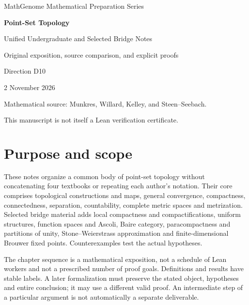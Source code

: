 \documentclass[11pt,oneside,openany]{book}
\theoremstyle{definition}
\theoremstyle{remark}
\begin{document}
\frontmatter

\hypersetup{pageanchor=false}
\begin{titlepage}
\centering
\vspace*{22mm}
{\Large MathGenome Mathematical Preparation Series\par}
\vspace{18mm}
{\Huge\bfseries Point-Set Topology\par}
\vspace{8mm}
{\LARGE Unified Undergraduate and Selected Bridge Notes\par}
\vspace{16mm}
{\large Original exposition, source comparison, and explicit proofs\par}
\vfill
{\large Direction D10\par}
{\large 2 November 2026\par}
\vspace{10mm}
{\small Mathematical source: Munkres, Willard, Kelley, and Steen--Seebach.\par}
{\small This manuscript is not itself a Lean verification certificate.\par}
\end{titlepage}
\hypersetup{pageanchor=true}
\chapter*{Purpose and scope}
These notes organize a common body of point-set topology without concatenating
four textbooks or repeating each author's notation. Their core comprises
topological constructions and maps, general convergence, compactness,
connectedness, separation, countability, complete metric spaces and metrization.
Selected bridge material adds local compactness and compactifications, uniform
structures, function spaces and Ascoli, Baire category, paracompactness and
partitions of unity, Stone--Weierstrass approximation and finite-dimensional
Brouwer fixed points. Counterexamples test the actual hypotheses.

The chapter sequence is a mathematical exposition, not a schedule of Lean
workers and not a prescribed number of proof goals. Definitions and results have
stable labels. A later formalization must preserve the stated object, hypotheses
and entire conclusion; it may use a different valid proof. An intermediate step
of a particular argument is not automatically a separate deliverable.
\end{document}
